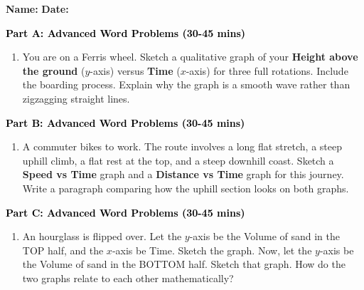 \documentclass[12pt, letterpaper, fleqn]{article}
\begin{document}
\textbf{Name:} \underline{\hspace{5cm}}
\hfill
\textbf{Date:} \underline{\hspace{3cm}}\\


\begin{tcolorbox}[colback=customteal!20]
\large\textcolor{black}{\textbf{Part A: Advanced Word Problems (30-45 mins)}}
\end{tcolorbox}

\vspace{3mm}

\begin{enumerate}[itemsep=5.5cm, leftmargin=0.6cm]
\item You are on a Ferris wheel. Sketch a qualitative graph of your \textbf{Height above the ground} ($y$-axis) versus \textbf{Time} ($x$-axis) for three full rotations. Include the boarding process. Explain why the graph is a smooth wave rather than zigzagging straight lines.
\end{enumerate}

\newpage

\begin{tcolorbox}[colback=customteal!20]
\large\textcolor{black}{\textbf{Part B: Advanced Word Problems (30-45 mins)}}
\end{tcolorbox}

\vspace{3mm}

\begin{enumerate}[itemsep=5.5cm, leftmargin=0.6cm, resume]
\item A commuter bikes to work. The route involves a long flat stretch, a steep uphill climb, a flat rest at the top, and a steep downhill coast. Sketch a \textbf{Speed vs Time} graph and a \textbf{Distance vs Time} graph for this journey. Write a paragraph comparing how the uphill section looks on both graphs.
\end{enumerate}

\newpage

\begin{tcolorbox}[colback=customteal!20]
\large\textcolor{black}{\textbf{Part C: Advanced Word Problems (30-45 mins)}}
\end{tcolorbox}

\vspace{3mm}

\begin{enumerate}[itemsep=5.5cm, leftmargin=0.6cm, resume]
\item An hourglass is flipped over. Let the $y$-axis be the Volume of sand in the TOP half, and the $x$-axis be Time. Sketch the graph. Now, let the $y$-axis be the Volume of sand in the BOTTOM half. Sketch that graph. How do the two graphs relate to each other mathematically?
\end{enumerate}
\end{document}
